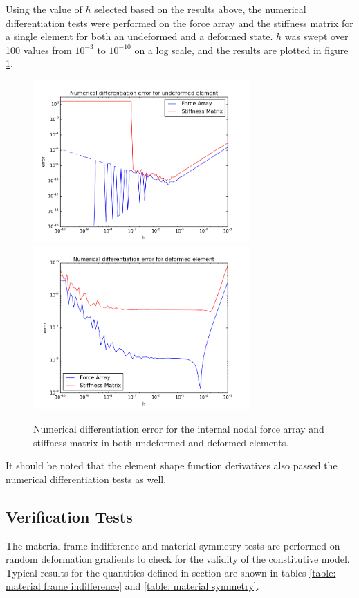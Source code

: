 \documentclass[]{spie}  %
\begin{document}
Using the value of $h$ selected based on the results above, the numerical differentiation tests were performed on the force array and the stiffness matrix for a single element for both an undeformed and a deformed state. $h$ was swept over 100 values from $10^{-3}$ to $10^{-10}$ on a log scale, and the results are plotted in figure \ref{fig: numerical differentiation error, force and stiffness}.

\begin{figure}[h]
	\centering
	\includegraphics[width=3.25in]{error_undeformed.png} \quad
	\includegraphics[width=3.25in]{error_deformed.png} 
	\caption{Numerical differentiation error for the internal nodal force array and stiffness matrix in both undeformed and deformed elements.} 
	\label{fig: numerical differentiation error, force and stiffness}
\end{figure}

It should be noted that the element shape function derivatives also passed the numerical differentiation tests as well. 

\subsection{Verification Tests}
The material frame indifference and material symmetry tests are performed on random deformation gradients to check for the validity of the constitutive model. Typical results for the quantities defined in section \textit{} are shown in tables \ref{table: material frame indifference} and \ref{table: material symmetry}.
\end{document}
